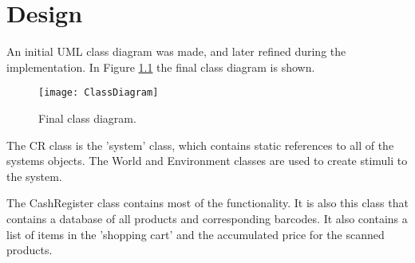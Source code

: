\chapter{Design}
An initial UML class diagram was made, and later refined during the implementation. 
In Figure \ref{fig:ClassDiagram} the final class diagram is shown.

\begin{figure}[H]
\centering
\texttt{[image: ClassDiagram]}
\caption{Final class diagram.}
\label{fig:ClassDiagram}
\end{figure}

The CR class is the 'system' class, which contains static references to all of the systems objects. 
The World and Environment classes are used to create stimuli to the system.

The CashRegister class contains most of the functionality. It is also this class that contains a database of all products and corresponding barcodes. 
It also contains a list of items in the 'shopping cart' and the accumulated price for the scanned products.